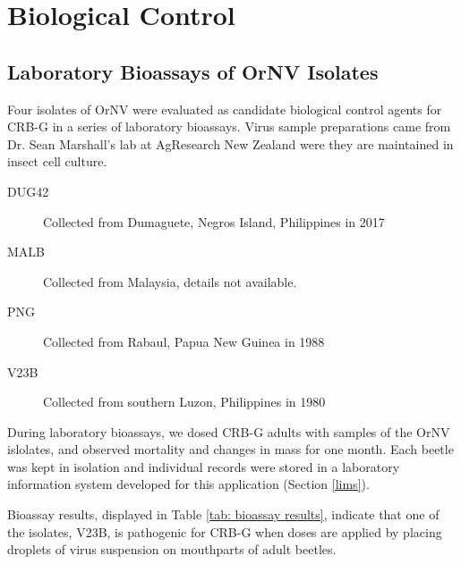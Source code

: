 \documentclass[12pt,
letterpaper,english,bibliography=totocnumbered, abstract=on]{scrartcl}
\begin{document}
\section{Biological Control}

\subsection{Laboratory Bioassays of OrNV Isolates}

Four isolates of OrNV were evaluated as candidate biological control agents for CRB-G in a series of laboratory bioassays. Virus sample preparations came from Dr. Sean Marshall's lab at AgResearch New Zealand were they are maintained in insect cell culture.

\begin{description}
	\item[DUG42] Collected from Dumaguete, Negros Island, Philippines in 2017
	\item[MALB] Collected from Malaysia, details not available.
	\item[PNG] Collected from Rabaul, Papua New Guinea in 1988
	\item[V23B] Collected from southern Luzon, Philippines in 1980
\end{description}

During laboratory bioassays, we dosed CRB-G adults with samples of the OrNV islolates, and observed mortality and changes in mass for one month. Each beetle was kept in isolation and individual records were stored in a laboratory information system developed for this application (Section \ref{lims}).



Bioassay results, displayed in Table \ref{tab: bioassay results}, indicate that one of the isolates, V23B, is pathogenic for CRB-G when doses are applied by placing droplets of virus suspension on mouthparts of adult beetles.
\end{document}
